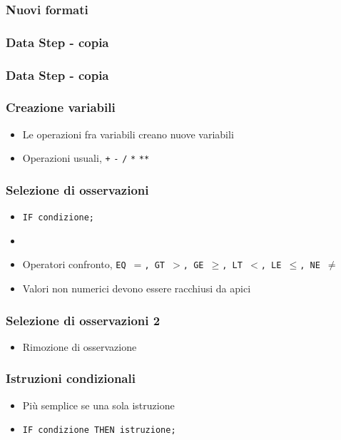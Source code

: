 \begin{frame}[containsverbatim]\frametitle{Nuovi formati}
\end{frame}



\begin{frame}[fragile]\frametitle{Data Step - copia }
\end{frame}


\begin{frame}[fragile]\frametitle{Data Step - copia }
\end{frame}



\begin{frame}[fragile]\frametitle{Creazione variabili}

  \begin{itemize}
  \item
    Le operazioni fra variabili creano nuove variabili
  \item
    Operazioni usuali, \verb!+! \verb!-! \verb!/! \verb!*! \verb!**!
  \end{itemize}
\end{frame}




\begin{frame}[containsverbatim]\frametitle{Selezione di osservazioni}
  \begin{itemize}
  \item
    \verb!IF condizione;!
  \item
  \item
    Operatori confronto, \texttt{EQ $=$, GT $>$, GE $\geq$, LT $<$, LE $\leq$, NE $\neq$}
  \item
    Valori non numerici devono essere racchiusi da apici
  \end{itemize}\end{frame}

\begin{frame}[containsverbatim]\frametitle{Selezione di osservazioni 2}
  \begin{itemize}
  \item
    Rimozione di osservazione
  \end{itemize}\end{frame}

\begin{frame}[containsverbatim]\frametitle{Istruzioni condizionali}
  \begin{itemize}
  \item
    Pi{\`u} semplice se una sola istruzione
  \item
    \verb!IF condizione THEN istruzione;!
  \end{itemize}
\end{frame}

